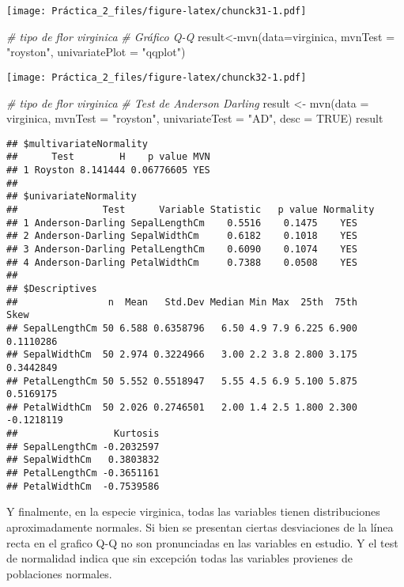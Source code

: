\documentclass[
]{article}
\newenvironment{Shaded}{\begin{snugshade}}{\end{snugshade}}
\newcommand{\AttributeTok}[1]{\textcolor[rgb]{0.77,0.63,0.00}{#1}}
\newcommand{\CommentTok}[1]{\textcolor[rgb]{0.56,0.35,0.01}{\textit{#1}}}
\newcommand{\ConstantTok}[1]{\textcolor[rgb]{0.00,0.00,0.00}{#1}}
\newcommand{\FunctionTok}[1]{\textcolor[rgb]{0.00,0.00,0.00}{#1}}
\newcommand{\NormalTok}[1]{#1}
\newcommand{\OtherTok}[1]{\textcolor[rgb]{0.56,0.35,0.01}{#1}}
\newcommand{\StringTok}[1]{\textcolor[rgb]{0.31,0.60,0.02}{#1}}
\begin{document}
\texttt{[image: Práctica\_2\_files/figure-latex/chunck31-1.pdf]}

\begin{Shaded}
\begin{Highlighting}[]
\CommentTok{\# tipo de flor virginica}
\CommentTok{\# Gráfico Q{-}Q}
\NormalTok{result}\OtherTok{\textless{}{-}}\FunctionTok{mvn}\NormalTok{(}\AttributeTok{data=}\NormalTok{virginica, }\AttributeTok{mvnTest =} \StringTok{"royston"}\NormalTok{, }\AttributeTok{univariatePlot =} \StringTok{"qqplot"}\NormalTok{)}
\end{Highlighting}
\end{Shaded}

\texttt{[image: Práctica\_2\_files/figure-latex/chunck32-1.pdf]}

\begin{Shaded}
\begin{Highlighting}[]
\CommentTok{\# tipo de flor virginica}
\CommentTok{\# Test de Anderson Darling}
\NormalTok{result }\OtherTok{\textless{}{-}} \FunctionTok{mvn}\NormalTok{(}\AttributeTok{data =}\NormalTok{ virginica, }\AttributeTok{mvnTest =} \StringTok{"royston"}\NormalTok{, }\AttributeTok{univariateTest =} \StringTok{"AD"}\NormalTok{, }\AttributeTok{desc =} \ConstantTok{TRUE}\NormalTok{)}
\NormalTok{result}
\end{Highlighting}
\end{Shaded}

\begin{verbatim}
## $multivariateNormality
##      Test        H    p value MVN
## 1 Royston 8.141444 0.06776605 YES
## 
## $univariateNormality
##               Test      Variable Statistic   p value Normality
## 1 Anderson-Darling SepalLengthCm    0.5516    0.1475    YES   
## 2 Anderson-Darling SepalWidthCm     0.6182    0.1018    YES   
## 3 Anderson-Darling PetalLengthCm    0.6090    0.1074    YES   
## 4 Anderson-Darling PetalWidthCm     0.7388    0.0508    YES   
## 
## $Descriptives
##                n  Mean   Std.Dev Median Min Max  25th  75th       Skew
## SepalLengthCm 50 6.588 0.6358796   6.50 4.9 7.9 6.225 6.900  0.1110286
## SepalWidthCm  50 2.974 0.3224966   3.00 2.2 3.8 2.800 3.175  0.3442849
## PetalLengthCm 50 5.552 0.5518947   5.55 4.5 6.9 5.100 5.875  0.5169175
## PetalWidthCm  50 2.026 0.2746501   2.00 1.4 2.5 1.800 2.300 -0.1218119
##                 Kurtosis
## SepalLengthCm -0.2032597
## SepalWidthCm   0.3803832
## PetalLengthCm -0.3651161
## PetalWidthCm  -0.7539586
\end{verbatim}

Y finalmente, en la especie virginica, todas las variables tienen
distribuciones aproximadamente normales. Si bien se presentan ciertas
desviaciones de la línea recta en el grafico Q-Q no son pronunciadas en
las variables en estudio. Y el test de normalidad indica que sin
excepción todas las variables provienes de poblaciones normales.
\end{document}
